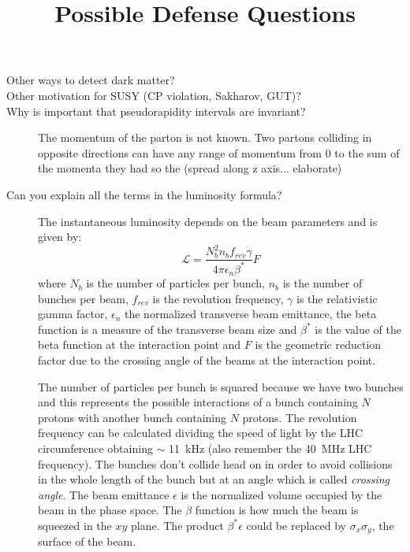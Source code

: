 \documentclass[a4paper,10pt,twoside,notitlepage]{article}
\title{Possible Defense Questions}
\begin{document}
\maketitle

\begin{description}
\item[Other ways to detect dark matter?]

\item[Other motivation for SUSY (CP violation, Sakharov, GUT)?]

\item[Why is important that pseudorapidity intervals are invariant?] The
  momentum of the parton is not known. Two partons colliding in opposite
  directions can have any range of momentum from 0 to the sum of the momenta
  they had so the (spread along z axis... elaborate)

\item[Can you explain all the terms in the luminosity formula?] The
  instantaneous luminosity depends on the beam parameters and is given by:
  \begin{equation}
    \label{eq:1}
    \mathcal{L} = \frac{N^2_b n_b f_{rev} \gamma}{4 \pi \epsilon_n \beta^*} F
  \end{equation}
  where $N_b$ is the number of particles per bunch, $n_b$ is the number of
  bunches per beam, $f_{rev}$ is the revolution frequency, $\gamma$ is the
  relativistic gamma factor, $\epsilon_n$ the normalized transverse beam
  emittance, the beta function is a measure of the transverse beam size and
  $\beta^*$ is the value of the beta function at the interaction point and $F$
  is the geometric reduction factor due to the crossing angle of the beams at
  the interaction point.

  The number of particles per bunch is squared because we have two bunches and
  this represents the possible interactions of a bunch containing $N$ protons
  with another bunch containing $N$ protons. The revolution frequency can be
  calculated dividing the speed of light by the LHC circumference obtaining
  $\sim$ 11~kHz (also remember the 40~MHz LHC frequency). The bunches don't
  collide head on in order to avoid collisions in the whole length of the bunch
  but at an angle which is called \emph{crossing angle}. The beam emittance
  $\epsilon$ is the normalized volume occupied by the beam in the phase
  space. The $\beta$ function is how much the beam is squeezed in the $xy$
  plane. The product $\beta^* \epsilon$ could be replaced by
  $\sigma_x \sigma_y$, the surface of the beam.


\end{description}
\end{document}
